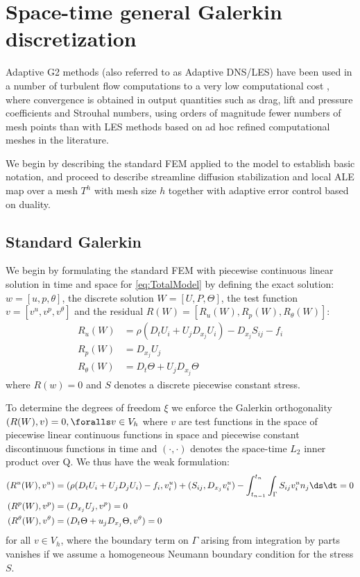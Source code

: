 \section{Space-time general Galerkin discretization}

Adaptive G2 methods (also referred to as
Adaptive DNS/LES) have been used in a number of
turbulent flow computations to a very low computational cost
\citep{Hoffman2005,HoffmanJohnson2006b,Hoffman2006,Hoffman2009,HoffmanJansson2009,VilelaJanssonEtAl2010},
where convergence is obtained in output quantities such as drag,
lift and pressure coefficients and Strouhal numbers, using orders of
magnitude fewer numbers of mesh points than with LES methods based on
ad hoc refined computational meshes in the literature.

We begin by describing the standard FEM applied to the model to establish
basic notation, and proceed to describe streamline diffusion stabilization
and local ALE map over a mesh $T^h$ with mesh size $h$ together with
adaptive error control based on duality.

\subsection{Standard Galerkin}

We begin by formulating the standard \cgone{}\cgone{} FEM
\citep{ErikssonEstepHansboEtAl1996} with piecewise continuous linear
solution in time and space for \ref{eq:TotalModel} by defining the
exact solution: $w = [u, p, \theta]$, the discrete solution $W = [U, P,
\Theta]$, the test function $v = [v^u, v^p, v^\theta]$ and the residual
$R(W) = [R_u(W), R_p(W), R_\theta(W)]$:
\begin{equation} \label{eq:TotalModel}
  \begin{split}
    R_u(W) &= \rho(D_t U_i + U_j D_{x_j} U_i) - D_{x_j} S_{ij} - f_i\\
    R_p(W) &= D_{x_j} U_j\\
    R_\theta(W) &= D_t \Theta + U_j D_{x_j} \Theta
  \end{split}
\end{equation}
where $R(w) = 0$ and $S$ denotes a discrete piecewise constant stress.

To determine the degrees of freedom $\xi$ we enforce the Galerkin
orthogonality $(R(W), v) = 0, \foralls v \in V_h$ where $v$ are test
functions in the space of piecewise linear continuous functions in space
and piecewise constant discontinuous functions in time and $(\cdot,\cdot)$
denotes the space-time $L_2$ inner product over Q. We thus have the
weak formulation:
\begin{align}
  (R^u(W), v^u) &= (\rho(D_t U_i + U_j D_j U_i) - f_i, v^u_i) + (S_{ij}, D_{x_j} v^u_i) - \int_{t_{n-1}}^{t_n}\int_\Gamma S_{ij} v^u_i n_j \ds \dt = 0\\
  (R^p(W), v^p) &= (D_{x_j} U_j, v^p) = 0\\
  (R^\theta(W), v^\theta) &= (D_t \Theta + u_j D_{x_j} \Theta, v^\theta) = 0
\end{align}
for all $v \in V_h$, where the boundary term on $\Gamma$ arising from
integration by parts vanishes if we assume a homogeneous Neumann boundary
condition for the stress $S$.


